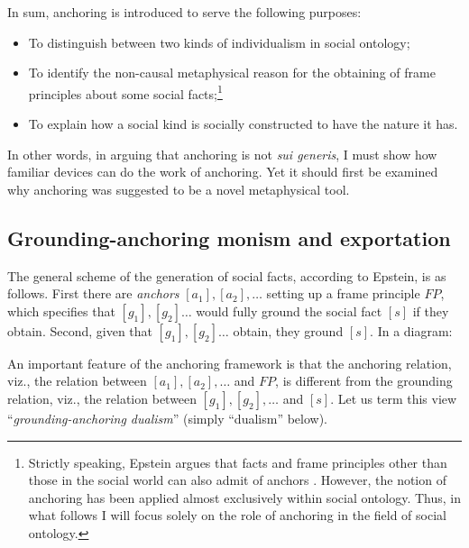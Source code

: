 \documentclass[12pt]{article}
\begin{document}
\par
In sum, anchoring is introduced to serve the following purposes:
\begin{itemize}
    \item[(A1)] To distinguish between two kinds of individualism in social ontology;
    \item[(A2)] To identify the non-causal metaphysical reason for the obtaining of frame principles about some social facts;\footnote{
    Strictly speaking, Epstein argues that facts and frame principles other than those in the social world can also admit of anchors \citep[see especially][]{Epstein2019-EPSAVG}. However, the notion of anchoring has been applied almost exclusively within social ontology. Thus, in what follows I will focus solely on the role of anchoring in the field of social ontology. 
}
    \item[(A3)] To explain how a social kind is socially constructed to have the nature it has.
\end{itemize}
In other words, in arguing that anchoring is not \textit{sui generis}, I must show how familiar devices can do the work of anchoring. Yet it should first be examined why anchoring was suggested to be a novel metaphysical tool. 

\subsection{Grounding-anchoring monism and exportation}

The general scheme of the generation of social facts, according to Epstein, is as follows. First there are \textit{anchors} $[a_1], [a_2], \dots$ setting up a frame principle $FP$, which specifies that $[g_1], [g_2] \dots$ would fully ground the social fact $[s]$ if they obtain. Second, given that $[g_1], [g_2] \dots$ obtain, they ground $[s]$. In a diagram:

\begin{center}
\end{center}
An important feature of the anchoring framework is that the anchoring relation, viz., the relation between $[a_1], [a_2], \dots$ and $FP$, is different from the grounding relation, viz., the relation between $[g_1], [g_2], \dots$ and $[s]$. Let us term this view ``\textit{grounding-anchoring dualism}'' (simply ``dualism'' below).
\end{document}
